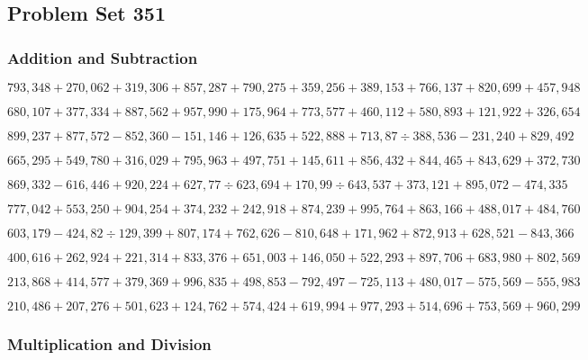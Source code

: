 \hypertarget{problem-set-351}{%
\subsection{Problem Set 351}\label{problem-set-351}}

\hypertarget{addition-and-subtraction}{%
\subsubsection{Addition and
Subtraction}\label{addition-and-subtraction}}

\(793,348+270,062+319,306+857,287+790,275+359,256+389,153+766,137+820,699+457,948\)

\(680,107+377,334+887,562+957,990+175,964+773,577+460,112+580,893+121,922+326,654\)

\(899,237+877,572-852,360-151,146+126,635+522,888+713,87÷388,536-231,240+829,492\)

\(665,295+549,780+316,029+795,963+497,751+145,611+856,432+844,465+843,629+372,730\)

\(869,332-616,446+920,224+627,77÷623,694+170,99÷643,537+373,121+895,072-474,335\)

\(777,042+553,250+904,254+374,232+242,918+874,239+995,764+863,166+488,017+484,760\)

\(603,179-424,82÷129,399+807,174+762,626-810,648+171,962+872,913+628,521-843,366\)

\(400,616+262,924+221,314+833,376+651,003+146,050+522,293+897,706+683,980+802,569\)

\(213,868+414,577+379,369+996,835+498,853-792,497-725,113+480,017-575,569-555,983\)

\(210,486+207,276+501,623+124,762+574,424+619,994+977,293+514,696+753,569+960,299\)

\hypertarget{multiplication-and-division}{%
\subsubsection{Multiplication and
Division}\label{multiplication-and-division}}


